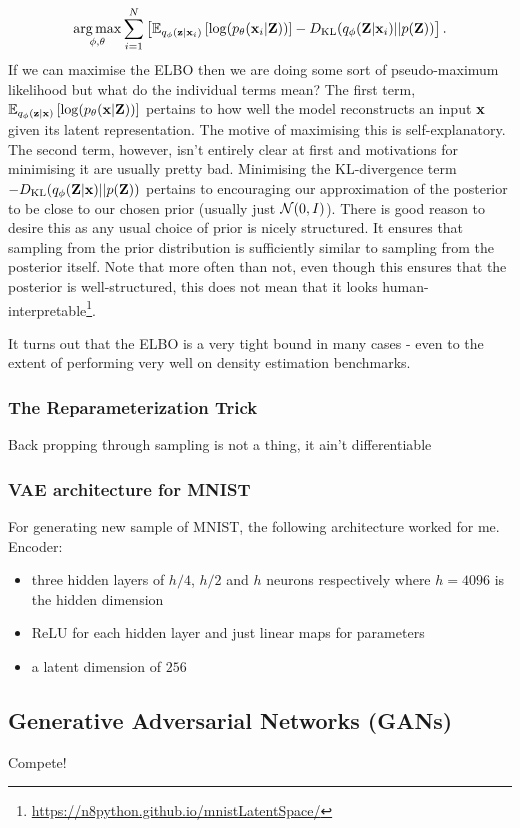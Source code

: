 \documentclass[11pt]{article}
\begin{document}
$$
\operatorname*{arg\,max}_{\phi,\theta}\sum_{i=1}^N\left[\mathbb{E}_{q_{\phi}(\mathbf{z}|\mathbf{x}_i)}\left[\log(p_{\theta}(\mathbf{x}_i|\mathbf{Z}))\right]-D_{\text{KL}}(q_{\phi}(\mathbf{Z}|\mathbf{x}_i)||p(\mathbf{Z}))\right].
$$
If we can maximise the ELBO then we are doing some sort of pseudo-maximum likelihood but what do the individual terms mean? The first term, $\mathbb{E}_{q_{\phi}(\mathbf{z}|\mathbf{x})}\left[\log(p_{\theta}(\mathbf{x}|\mathbf{Z}))\right]$ pertains to how well the model reconstructs an input $\mathbf{x}$ given its latent representation. The motive of maximising this is self-explanatory. The second term, however, isn't entirely clear at first and motivations for minimising it are usually pretty bad. Minimising the KL-divergence term $-D_{\text{KL}}(q_{\phi}(\mathbf{Z}|\mathbf{x})||p(\mathbf{Z}))$ pertains to encouraging our approximation of the posterior to be close to our chosen prior (usually just $\mathcal{N}(0,I)$). There is good reason to desire this as any usual choice of prior is nicely structured. It ensures that sampling from the prior distribution is sufficiently similar to sampling from the posterior itself. Note that more often than not, even though this ensures that the posterior is well-structured, this does not mean that it looks human-interpretable\footnote{\url{https://n8python.github.io/mnistLatentSpace/}}.

It turns out that the ELBO is a very tight bound in many cases - even to the extent of performing very well on density estimation benchmarks.

\subsubsection{The Reparameterization Trick}
Back propping through sampling is not a thing, it ain't differentiable 

\subsubsection{VAE architecture for MNIST}
For generating new sample of MNIST, the following architecture worked for me. Encoder:
\begin{itemize}
    \item three hidden layers of $h/4$, $h/2$ and $h$ neurons respectively where $h=4096$ is the hidden dimension
    \item ReLU for each hidden layer and just linear maps for parameters
    \item a latent dimension of $256$
\end{itemize}

\subsection{Generative Adversarial Networks (GANs)}
Compete!
\end{document}

